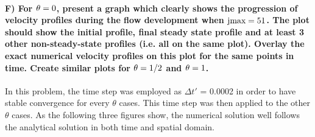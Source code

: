 \documentclass[letterpaper,10pt,english]{sphinxmanual}
\begin{document}
\paragraph{F) For \protect\(\theta = 0\protect\), present a graph which clearly shows the progression of velocity profiles during the flow development when \protect\(\text{jmax} = 51\protect\). The plot should show the initial profile, final steady state profile and at least 3 other non-steady-state profiles (i.e. all on the same plot). Overlay the exact numerical velocity profiles on this plot for the same points in time. Create similar plots for \protect\(\theta = 1/2\protect\) and \protect\(\theta = 1\protect\).}
\label{\detokenize{cases/results:f-for-present-a-graph-which-clearly-shows-the-progression-of-velocity-profiles-during-the-flow-development-when-the-plot-should-show-the-initial-profile-final-steady-state-profile-and-at-least-3-other-non-steady-state-profiles-i-e-all-on-the-same-plot-overlay-the-exact-numerical-velocity-profiles-on-this-plot-for-the-same-points-in-time-create-similar-plots-for-and}}
In this problem, the time step was employed as \(\Delta t'\) = 0.0002 in order to have stable convergence for every \(\theta\) cases. This time step was then applied to the other \(\theta\) cases. As the following three figures show, the numerical solution well follows the analytical solution in both time and spatial domain.
\end{document}
